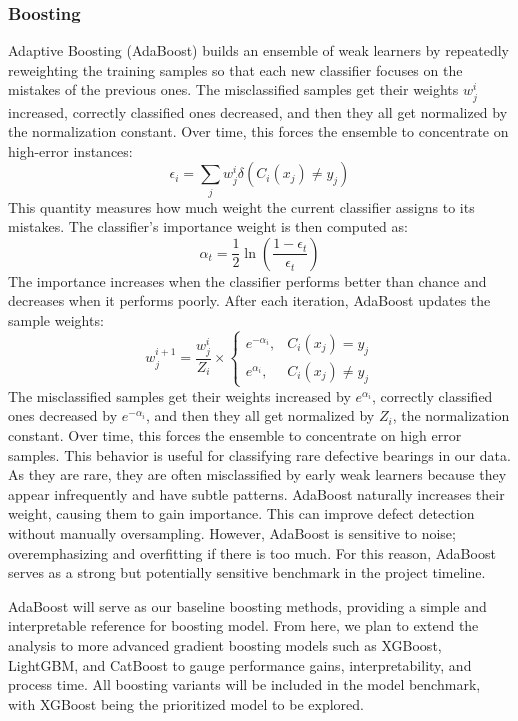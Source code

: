 \documentclass{article}
\begin{document}
\subsubsection*{Boosting}
Adaptive Boosting (AdaBoost) builds an ensemble of weak learners by repeatedly reweighting the training samples so that each new classifier focuses on the mistakes of the previous ones. The misclassified samples get their weights $w_j^i$ increased, correctly classified ones decreased, and then they all get normalized by the normalization constant. Over time, this forces the ensemble to concentrate on high-error instances:
$$\epsilon_i = \sum_{j} w_j^i \delta(C_i(x_j) \neq y_j)$$
This quantity measures how much weight the current classifier assigns to its mistakes. The classifier’s importance weight is then computed as:
$$\alpha_{t} = \frac{1}{2} \ln\left(\frac{1 - \epsilon_{t}}{\epsilon_{t}}\right)$$
The importance increases when the classifier performs better than chance and decreases when it performs poorly. After each iteration, AdaBoost updates the sample weights:
$$w_{j}^{i+1} = \frac{w_{j}^{i}}{Z_{i}} \times \begin{cases} e^{-\alpha_{i}}, & C_{i}(x_{j}) = y_{j} \\ e^{\alpha_{i}}, & C_{i}(x_{j}) \neq y_{j} \end{cases}$$
The misclassified samples get their weights increased by $e^{\alpha_i}$, correctly classified ones decreased by $e^{-\alpha_i}$, and then they all get normalized by $Z_i$, the normalization constant. Over time, this forces the ensemble to concentrate on high error samples. This behavior is useful for classifying rare defective bearings in our data. As they are rare, they are often misclassified by early weak learners because they appear infrequently and have subtle patterns. AdaBoost naturally increases their weight, causing them to gain importance. This can improve defect detection without manually oversampling. However, AdaBoost is sensitive to noise; overemphasizing and overfitting if there is too much. For this reason, AdaBoost serves as a strong but potentially sensitive benchmark in the project timeline.
 
AdaBoost will serve as our baseline boosting methods, providing a simple and interpretable reference for boosting model. From here, we plan to extend the analysis to more advanced gradient boosting models such as XGBoost, LightGBM, and CatBoost to gauge performance gains, interpretability, and process time. All boosting variants will be included in the model benchmark, with XGBoost being the prioritized model to be explored.
 
\end{document}
